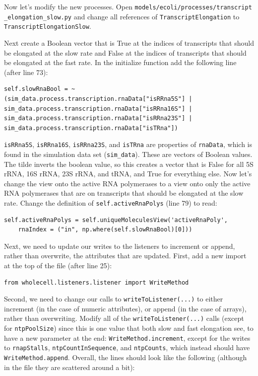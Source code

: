 \documentclass[12pt]{article}
\begin{document}
Now let's modify the new processes. Open \texttt{models/ecoli/processes/transcript \allowbreak \_elongation\_slow.py} and change all references of \texttt{TranscriptElongation} to \texttt{TranscriptElongationSlow}.

Next create a Boolean vector that is True at the indices of transcripts that should be elongated at the slow rate and False at the indices of transcripts that should be elongated at the fast rate. In the initialize function add the following line (after line 73):

\lstset{language=Python}
\begin{lstlisting}
self.slowRnaBool = ~(sim_data.process.transcription.rnaData["isRRna5S"] | sim_data.process.transcription.rnaData["isRRna16S"] | sim_data.process.transcription.rnaData["isRRna23S"] | sim_data.process.transcription.rnaData["isTRna"])
\end{lstlisting}

\texttt{isRRna5S}, \texttt{isRRna16S}, \texttt{isRRna23S}, and \texttt{isTRna} are properties of \texttt{rnaData}, which is found in the simulation data set (\texttt{sim\_data}). These are vectors of Boolean values. The tilde inverts the boolean value, so this creates a vector that is False for all 5S rRNA, 16S rRNA, 23S rRNA, and tRNA, and True for everything else.
Now let's change the view onto the active RNA polymerases to a view onto only the active RNA polymerases that are on transcripts that should be elongated at the slow rate. Change the definition of \texttt{self.activeRnaPolys} (line 79) to read:

\begin{lstlisting}
self.activeRnaPolys = self.uniqueMoleculesView('activeRnaPoly',
	rnaIndex = ("in", np.where(self.slowRnaBool)[0]))
\end{lstlisting}

Next, we need to update our writes to the listeners to increment or append, rather than overwrite, the attributes that are updated. First, add a new import at the top of the file (after line 25):
\begin{lstlisting}
from wholecell.listeners.listener import WriteMethod
\end{lstlisting}

Second, we need to change our calls to \texttt{writeToListener(...)} to either increment (in the case of numeric attributes), or append (in the case of arrays), rather than overwriting. Modify all of the \texttt{writeToListener(...)} calls (except for \texttt{ntpPoolSize}) since this is one value that both slow and fast elongation see, to have a new parameter at the end:  \texttt{WriteMethod.increment}, except for the writes to \texttt{rnapStalls}, \texttt{ntpCountInSequence}, and \texttt{ntpCounts}, which instead should have \texttt{WriteMethod.append}. Overall, the lines should look like the following (although in the file they are scattered around a bit):
\end{document}
